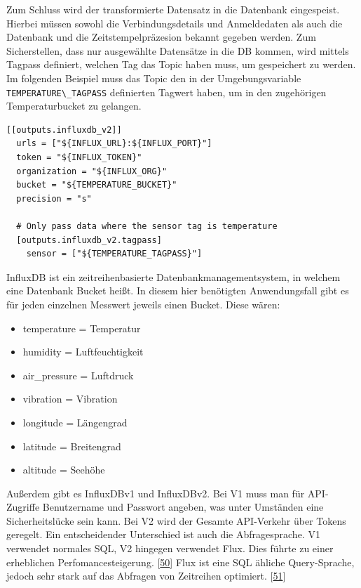 \documentclass[
    headings=optiontotocandhead,%
    twoside,
    numbers=noenddot,%
    12pt, %
    titlepage, %
    parskip=full, %
    listof=leveldown, 
    numbers=noenddot, %
    a4paper,DIV=14,
    BCOR=15mm,
]{scrbook}
\newcommand{\passthrough}[1]{#1}
\providecommand{\tightlist}{%
  \setlength{\itemsep}{0pt}\setlength{\parskip}{0pt}}
\begin{document}
Zum Schluss wird der transformierte Datensatz in die Datenbank
eingespeist. Hierbei müssen sowohl die Verbindungsdetails und
Anmeldedaten als auch die Datenbank und die Zeitstempelpräzesion bekannt
gegeben werden. Zum Sicherstellen, dass nur ausgewählte Datensätze in
die DB kommen, wird mittels Tagpass definiert, welchen Tag das Topic
haben muss, um gespeichert zu werden. Im folgenden Beispiel muss das
Topic den in der Umgebungsvariable
\passthrough{\lstinline!TEMPERATURE\_TAGPASS!} definierten Tagwert
haben, um in den zugehörigen Temperaturbucket zu gelangen.

\begin{lstlisting}[caption={Persistieren der Messwerte in die Datenbank}]
[[outputs.influxdb_v2]]
  urls = ["${INFLUX_URL}:${INFLUX_PORT}"]
  token = "${INFLUX_TOKEN}"
  organization = "${INFLUX_ORG}"
  bucket = "${TEMPERATURE_BUCKET}"
  precision = "s"
  
  # Only pass data where the sensor tag is temperature
  [outputs.influxdb_v2.tagpass]
    sensor = ["${TEMPERATURE_TAGPASS}"]
\end{lstlisting}

InfluxDB ist ein zeitreihenbasierte Datenbankmanagementsystem, in
welchem eine Datenbank Bucket heißt. In diesem hier benötigten
Anwendungsfall gibt es für jeden einzelnen Messwert jeweils einen
Bucket. Diese wären:

\begin{itemize}
\tightlist
\item
  temperature = Temperatur
\item
  humidity = Luftfeuchtigkeit
\item
  air\_pressure = Luftdruck
\item
  vibration = Vibration
\item
  longitude = Längengrad
\item
  latitude = Breitengrad
\item
  altitude = Seehöhe
\end{itemize}

Außerdem gibt es InfluxDBv1 und InfluxDBv2. Bei V1 muss man für
API-Zugriffe Benutzername und Passwort angeben, was unter Umständen eine
Sicherheitslücke sein kann. Bei V2 wird der Gesamte API-Verkehr über
Tokens geregelt. Ein entscheidender Unterschied ist auch die
Abfragesprache. V1 verwendet normales SQL, V2 hingegen verwendet Flux.
Dies führte zu einer erheblichen Perfomancesteigerung.
{[}\protect\hyperlink{ref-influx-v1-vs-v2}{50}{]} Flux ist eine SQL
ähliche Query-Sprache, jedoch sehr stark auf das Abfragen von Zeitreihen
optimiert. {[}\protect\hyperlink{ref-flux}{51}{]}
\end{document}
